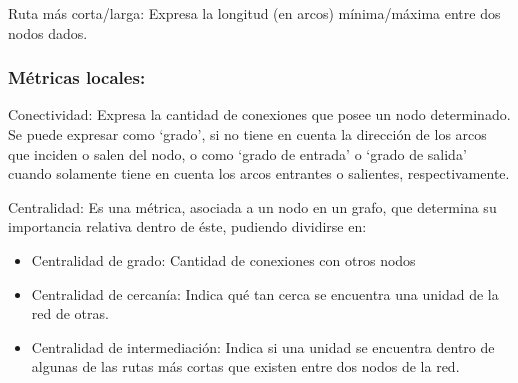 	Ruta más corta/larga: Expresa la longitud (en arcos) mínima/máxima entre dos nodos dados. 
	
	\subsubsection{Métricas locales:}
	
	Conectividad: Expresa la cantidad de conexiones que posee un nodo determinado. Se puede expresar como ‘grado’, si no tiene en cuenta la dirección de los arcos que inciden o salen del nodo, o como ‘grado de entrada’ o ‘grado de salida’ cuando solamente tiene en cuenta los arcos entrantes o salientes, respectivamente.
	
	Centralidad: Es una métrica, asociada a un nodo en un grafo, que determina su importancia relativa dentro de éste, pudiendo dividirse en:
	
	\begin{itemize}
		\item Centralidad de grado: Cantidad de conexiones con otros nodos
		\item Centralidad de cercanía: Indica qué tan cerca se encuentra una unidad de la red de otras.
		\item Centralidad de intermediación: Indica si una unidad se encuentra dentro de algunas de las rutas más cortas que existen entre dos nodos de la red.
	\end{itemize}
	
	
